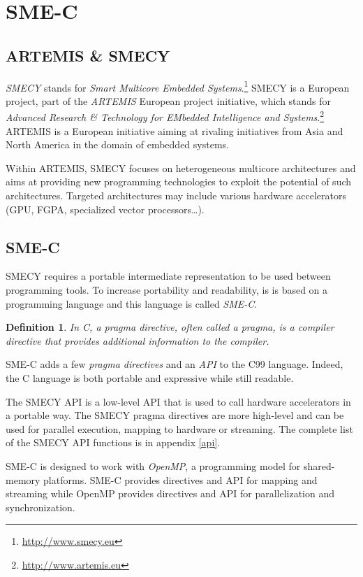 \documentclass[a4paper]{article}
\newtheorem{defdef}{Definition}
\begin{document}
\section{SME-C}
	\subsection{ARTEMIS \& SMECY}
 	\emph{SMECY} stands for \emph{Smart Multicore Embedded
      Systems}.\footnote{\url{http://www.smecy.eu}} SMECY is a European
    project, part of the \emph{ARTEMIS} European project initiative, which stands for \emph{Advanced Research \& Technology for EMbedded Intelligence and Systems}.\footnote{\url{http://www.artemis.eu}} ARTEMIS is a European initiative aiming at rivaling initiatives from Asia and North America in the domain of embedded systems.

	Within ARTEMIS, SMECY focuses on heterogeneous multicore architectures and aims at providing new programming technologies to exploit the potential of such architectures. Targeted architectures may include various hardware accelerators (GPU, FGPA, specialized vector processors\ldots).

	\subsection{SME-C}
	SMECY requires a portable intermediate representation to be used
    between programming tools. To increase portability and readability, is
    is based on a programming language and this language is called
    \emph{SME-C}.

	\begin{defdef} In C, a \emph{pragma directive}, often called a \emph{pragma}, is a compiler directive that provides additional information to the compiler.
	\end{defdef}
	
	SME-C adds a few \emph{pragma directives} and an \emph{API} to the C99 language. Indeed, the C language is both portable and expressive while still readable.
	
	The SMECY API is a low-level API that is used to call hardware
    accelerators in a portable way. The SMECY pragma directives are more
    high-level and can be used for parallel execution, mapping to hardware
    or streaming. The complete list of the SMECY API functions is in
    appendix \ref{api}.

	SME-C is designed to work with \emph{OpenMP}, a programming model for shared-memory platforms. SME-C provides directives and API for mapping and streaming while OpenMP provides directives and API for parallelization and synchronization.
	
\end{document}
